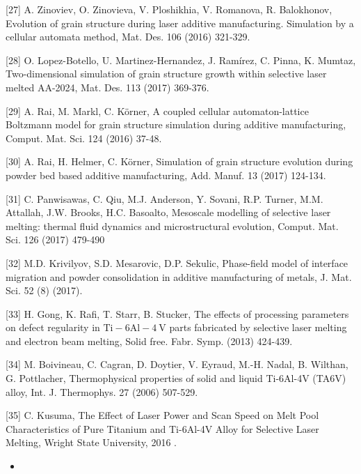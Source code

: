\documentclass[10pt]{article}
\begin{document}
[27] A. Zinoviev, O. Zinovieva, V. Ploshikhia, V. Romanova, R. Balokhonov, Evolution of grain structure during laser additive manufacturing. Simulation by a cellular automata method, Mat. Des. 106 (2016) 321-329.

[28] O. Lopez-Botello, U. Martinez-Hernandez, J. Ramírez, C. Pinna, K. Mumtaz, Two-dimensional simulation of grain structure growth within selective laser melted AA-2024, Mat. Des. 113 (2017) 369-376.

[29] A. Rai, M. Markl, C. Körner, A coupled cellular automaton-lattice Boltzmann model for grain structure simulation during additive manufacturing, Comput. Mat. Sci. 124 (2016) 37-48.

[30] A. Rai, H. Helmer, C. Körner, Simulation of grain structure evolution during powder bed based additive manufacturing, Add. Manuf. 13 (2017) 124-134.

[31] C. Panwisawas, C. Qiu, M.J. Anderson, Y. Sovani, R.P. Turner, M.M. Attallah, J.W. Brooks, H.C. Basoalto, Mesoscale modelling of selective laser melting: thermal fluid dynamics and microstructural evolution, Comput. Mat. Sci. 126 (2017) 479-490

[32] M.D. Krivilyov, S.D. Mesarovic, D.P. Sekulic, Phase-field model of interface migration and powder consolidation in additive manufacturing of metals, J. Mat. Sci. 52 (8) (2017).

[33] H. Gong, K. Rafi, T. Starr, B. Stucker, The effects of processing parameters on defect regularity in $\mathrm{Ti}-6 \mathrm{Al}-4 \mathrm{~V}$ parts fabricated by selective laser melting and electron beam melting, Solid free. Fabr. Symp. (2013) 424-439.

[34] M. Boivineau, C. Cagran, D. Doytier, V. Eyraud, M.-H. Nadal, B. Wilthan, G. Pottlacher, Thermophysical properties of solid and liquid Ti-6Al-4V (TA6V) alloy, Int. J. Thermophys. 27 (2006) 507-529.

[35] C. Kusuma, The Effect of Laser Power and Scan Speed on Melt Pool Characteristics of Pure Titanium and Ti-6Al-4V Alloy for Selective Laser Melting, Wright State University, 2016 .

\begin{itemize}
  \item 
\end{itemize}
\end{document}
